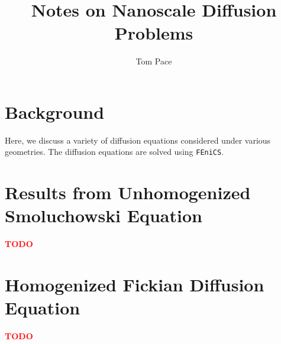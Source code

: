 \documentclass{article}
\begin{document}
\title{Notes on Nanoscale Diffusion Problems}
\author{Tom Pace}
\maketitle

\tableofcontents

\section{Background}\label{sec:background}

Here, we discuss a variety of diffusion equations
considered under various geometries.
The diffusion equations are solved using \texttt{FEniCS}.











\section{Results from Unhomogenized Smoluchowski Equation}\label{sec:res_unhom_smol}

\textcolor{red}{\textbf{TODO}}



\section{Homogenized Fickian Diffusion Equation}\label{sec:hom_fick}

\textcolor{red}{\textbf{TODO}}

\printbibliography
\end{document}
